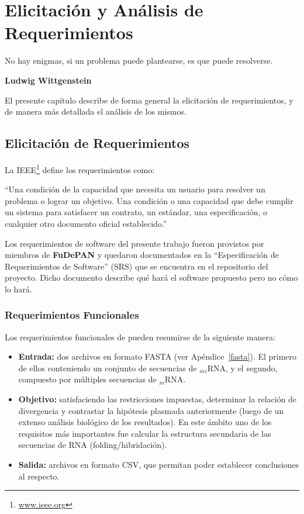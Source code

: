 \chapter{Elicitación y Análisis de Requerimientos}
\label{analisis}

\epigraph{No hay enigmas, si un problema puede plantearse, 
es que puede resolverse.}%
{\textbf{Ludwig Wittgenstein}}

\par El presente capítulo describe de forma general la elicitación de requerimientos, y de manera más detallada el análisis de los mismos.

\section{Elicitación de Requerimientos}
\par La IEEE\footnote{\url{www.ieee.org}} define los requerimientos como: 
\begin{center}
``Una condición de la capacidad que necesita un usuario para resolver un problema o lograr un objetivo. Una condición o una capacidad que debe cumplir un sistema para satisfacer un contrato, un estándar, una especificación, o cualquier otro documento oficial establecido.''
\end{center}
Los requerimientos de software del presente trabajo fueron provistos por miembros de \textbf{FuDePAN} y quedaron documentados en la ``Especificación de Requerimientos de Software'' (SRS) que se encuentra en el repositorio del proyecto. Dicho documento describe qué hará el software propuesto pero no cómo lo hará.

\subsection{Requerimientos Funcionales}
Los requerimientos funcionales de \remo pueden resumirse de la siguiente manera:

\begin{itemize}
	\item \textbf{Entrada:} dos archivos en formato FASTA (ver Apéndice~\ref{fasta}). El primero de ellos conteniendo un conjunto de secuencias de $_m$$_i$RNA, y el segundo, compuesto por múltiples secuencias de $_m$RNA.

	\item \textbf{Objetivo:} satisfaciendo las restricciones impuestas, determinar la relación de divergencia y contrastar la hipótesis plasmada anteriormente (luego de un extenso análisis biológico de los resultados). En este ámbito uno de los requisitos más importantes fue calcular la estructura secundaria de las secuencias de RNA (folding/hibridación).
							 
	\item \textbf{Salida:} archivos en formato CSV, que permitan poder establecer conclusiones al respecto. 
\end{itemize}

